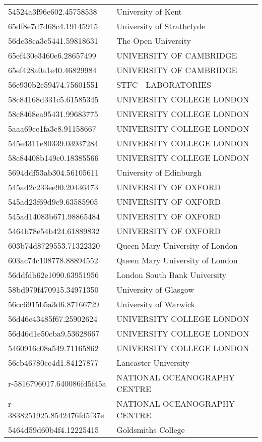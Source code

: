 \begin{tabular}{ll}
54524a3f96e602.45758538 & University of Kent \\
65df8e7d7d68c4.19145915 & University of Strathclyde \\
56dc38ca3c5441.59818631 & The Open University \\
65ef430e3460e6.28657499 & UNIVERSITY OF CAMBRIDGE \\
65ef428a0a1e40.46829984 & UNIVERSITY OF CAMBRIDGE \\
56e930b2c59474.75601551 & STFC - LABORATORIES \\
58c84168d331c5.61585345 & UNIVERSITY COLLEGE LONDON \\
58c8468ea95431.99683775 & UNIVERSITY COLLEGE LONDON \\
5aaa69ce1fa3c8.91158667 & UNIVERSITY COLLEGE LONDON \\
545e4311e80339.03937284 & UNIVERSITY COLLEGE LONDON \\
58c84408b149c0.18385566 & UNIVERSITY COLLEGE LONDON \\
5694ddf53ab304.56105611 & University of Edinburgh \\
545ad2c233ee90.20436473 & UNIVERSITY OF OXFORD \\
545ad23f69d9c9.63585905 & UNIVERSITY OF OXFORD \\
545ad14083b671.98865484 & UNIVERSITY OF OXFORD \\
5464b78e54b424.61889832 & UNIVERSITY OF OXFORD \\
603b74d8729553.71322320 & Queen Mary University of London \\
603ac74c108778.88894552 & Queen Mary University of London \\
56ddfdb62e1090.63951956 & London South Bank University \\
58bd979f470915.34971350 & University of Glasgow \\
56cc6915b5a3d6.87166729 & University of Warwick \\
56d46e43485f67.25902624 & UNIVERSITY COLLEGE LONDON \\
56d46d1e50cba9.53628667 & UNIVERSITY COLLEGE LONDON \\
5460916c08a549.71165862 & UNIVERSITY COLLEGE LONDON \\
56cb46780cc4d1.84127877 & Lancaster University \\
r-5816796017.640086fd5f45a & NATIONAL OCEANOGRAPHY CENTRE \\
r-3838251925.8542476fd5f37e & NATIONAL OCEANOGRAPHY CENTRE \\
5464d59d60b4f4.12225415 & Goldsmiths College \\

\end{tabular}
